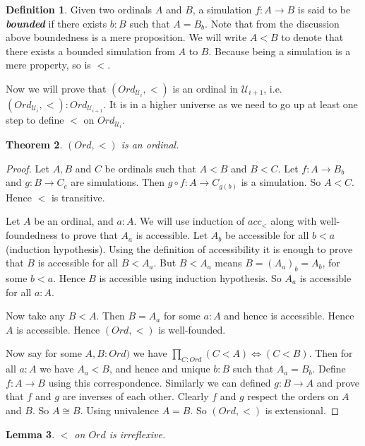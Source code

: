 \documentclass[11pt]{article}
\theoremstyle{definition}
\newtheorem{definition}{Definition}[section]
\theoremstyle{plain}
\newtheorem{theorem}[definition]{Theorem}
\newtheorem{lemma}[definition]{Lemma}
\theoremstyle{remark}
\newcommand{\U}{\mathscr{U}}
\begin{document}
\begin{definition}\label{D:Bdd sim}
Given two ordinals $A$ and $B$, a simulation $f : A \to B$ is said to be 
\textbf{\textit{bounded}} if there exists $b : B$ such that $A = B_b$. Note that from the
discussion above boundedness is a mere proposition. We will write $A < B$ to denote that 
there exists a bounded simulation from $A$ to $B$. Because being a simulation is a 
mere property, so is $<$.
\end{definition}

Now we will prove that $(Ord_{\U_i},<)$ is an ordinal in $\U_{i+1}$, i.e. 
$(Ord_{\U_i},<) : Ord_{\U_{i+1}}$. It is in a higher universe as we need to go up at least 
one step to define $<$ on $Ord_{\U_i}$.

\begin{theorem}\label{T:Ord is ord}
$(Ord,<)$ is an ordinal.
\end{theorem}

\begin{proof}
Let $A,B$ and $C$ be ordinals such that $A<B$ and $B<C$. Let $f : A \to B_b$ and $g : B\to C_c$
are simulations. Then $g \circ f : A \to C_{g(b)}$ is a simulation. So $A < C$. Hence 
$<$ is transitive. \smallskip

Let $A$ be an ordinal, and $a : A$. We will use induction of $acc_<$ along with 
well-foundedness to prove that $A_a$ is accessible. Let $A_b$ be accessible for all $b < a$
(induction hypothesis). Using the definition of accessibility it is enough to prove that 
$B$ is accessible for all $B < A_a$. But $B < A_a$ means $B = (A_a)_b = A_b$, for some 
$b < a$. Hence $B$ is accesible using induction hypothesis. So $A_a$ is accessible for
all $a : A$.\smallskip

Now take any $B < A$. Then $B = A_a$ for some $a : A$ and hence is accessible. Hence $A$ is
accessible. Hence $(Ord,<)$ is well-founded.\smallskip

Now say for some $A,B : Ord)$ we have $\prod_{C : Ord} (C < A) \iff (C < B)$. Then for all
$a : A$ we have $A_a < B$, and hence and unique $b : B$ such that $A_a = B_b$. Define 
$f : A \to B$  using this correspondence. Similarly we can defined $g : B \to A$ and prove
that $f$ and $g$ are inverses of each other. Clearly $f$ and $g$ respect the orders on
$A$ and $B$. So $A \cong B$. Using univalence $A = B$. So $(Ord, <)$ is extensional.
\end{proof}

\begin{lemma}
$<$ on $Ord$ is irreflexive.
\end{lemma}
\end{document}
